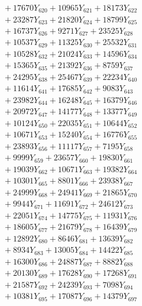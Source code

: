\documentclass[a4paper,10pt]{article}
\begin{document}
{\begin{align}
&\;  + 17670 Y_{620} + 10965 Y_{621} + 18173 Y_{622} \\[0.3ex]
&\;  + 23287 Y_{623} + 21820 Y_{624} + 18799 Y_{625} \\[0.3ex]
&\;  + 16737 Y_{626} + 9271 Y_{627} + 23525 Y_{628} \\[0.5ex]\allowbreak
&\;  + 10537 Y_{629} + 11325 Y_{630} + 25532 Y_{631} \\[0.3ex]
&\;  + 10528 Y_{632} + 21024 Y_{633} + 14596 Y_{634} \\[0.3ex]
&\;  + 15365 Y_{635} + 21392 Y_{636} + 8759 Y_{637} \\[0.3ex]
&\;  + 24295 Y_{638} + 25467 Y_{639} + 22234 Y_{640} \\[0.3ex]
&\;  + 11614 Y_{641} + 17685 Y_{642} + 9083 Y_{643} \\[0.3ex]
&\;  + 23982 Y_{644} + 16248 Y_{645} + 16379 Y_{646} \\[0.3ex]
&\;  + 20972 Y_{647} + 14177 Y_{648} + 13377 Y_{649} \\[0.3ex]
&\;  + 10124 Y_{650} + 22035 Y_{651} + 10644 Y_{652} \\[0.3ex]
&\;  + 10671 Y_{653} + 15240 Y_{654} + 16776 Y_{655} \\[0.3ex]
&\;  + 23893 Y_{656} + 11117 Y_{657} + 7195 Y_{658} \\[0.5ex]\allowbreak
&\;  + 9999 Y_{659} + 23657 Y_{660} + 19830 Y_{661} \\[0.3ex]
&\;  + 19039 Y_{662} + 10671 Y_{663} + 19382 Y_{664} \\[0.3ex]
&\;  + 10301 Y_{665} + 8801 Y_{666} + 23938 Y_{667} \\[0.3ex]
&\;  + 24999 Y_{668} + 24941 Y_{669} + 21865 Y_{670} \\[0.3ex]
&\;  + 9944 Y_{671} + 11691 Y_{672} + 24612 Y_{673} \\[0.3ex]
&\;  + 22051 Y_{674} + 14775 Y_{675} + 11931 Y_{676} \\[0.3ex]
&\;  + 18605 Y_{677} + 21679 Y_{678} + 16439 Y_{679} \\[0.3ex]
&\;  + 12892 Y_{680} + 8646 Y_{681} + 13639 Y_{682} \\[0.3ex]
&\;  + 8934 Y_{683} + 13005 Y_{684} + 14422 Y_{685} \\[0.3ex]
&\;  + 16300 Y_{686} + 24887 Y_{687} + 8882 Y_{688} \\[0.5ex]\allowbreak
&\;  + 20130 Y_{689} + 17628 Y_{690} + 17268 Y_{691} \\[0.3ex]
&\;  + 21587 Y_{692} + 24239 Y_{693} + 7098 Y_{694} \\[0.3ex]
&\;  + 10381 Y_{695} + 17087 Y_{696} + 14379 Y_{697} \\[0.3ex]

\end{align}}
\end{document}
